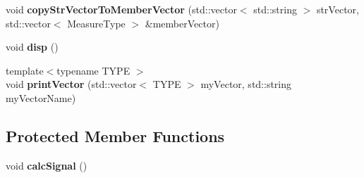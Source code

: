 \begin{DoxyCompactItemize}
\item 
\hypertarget{class_ox_1_1_test_data_a4c5bb0b0296218d61c608a8592900c39}{void {\bfseries copy\-Str\-Vector\-To\-Member\-Vector} (std\-::vector$<$ std\-::string $>$ str\-Vector, std\-::vector$<$ Measure\-Type $>$ \&member\-Vector)}\label{class_ox_1_1_test_data_a4c5bb0b0296218d61c608a8592900c39}

\item 
\hypertarget{class_ox_1_1_test_data_ac19364ea614dad392eefb4dbeb8a7903}{void {\bfseries disp} ()}\label{class_ox_1_1_test_data_ac19364ea614dad392eefb4dbeb8a7903}

\item 
\hypertarget{class_ox_1_1_test_data_a3de0e44dba2bd5e3b7556d662575378a}{{\footnotesize template$<$typename T\-Y\-P\-E $>$ }\\void {\bfseries print\-Vector} (std\-::vector$<$ T\-Y\-P\-E $>$ my\-Vector, std\-::string my\-Vector\-Name)}\label{class_ox_1_1_test_data_a3de0e44dba2bd5e3b7556d662575378a}

\end{DoxyCompactItemize}
\subsection*{Protected Member Functions}
\begin{DoxyCompactItemize}
\item 
\hypertarget{class_ox_1_1_test_data_a014e56191a98df90450c0b6fa2abc45d}{void {\bfseries calc\-Signal} ()}\label{class_ox_1_1_test_data_a014e56191a98df90450c0b6fa2abc45d}

\end{DoxyCompactItemize}

